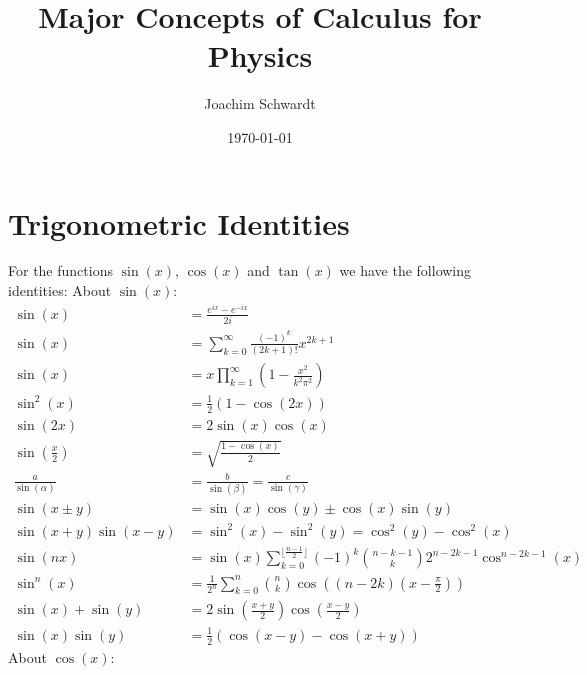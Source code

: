 \documentclass[a4paper,12pt]{article}
\begin{document}
\title{Major Concepts of Calculus for Physics}
\author{Joachim Schwardt}
\date{\today}
\maketitle

\section{Trigonometric Identities}
For the functions $\sin(x)$, $\cos(x)$ and $\tan(x)$ we have the following identities:
About $\sin(x)$:
\begin{align*}
\sin(x) &= \frac{e^{ix}-e^{-ix}}{2i} \\
\sin(x) &= \sum_{k=0}^{\infty}\frac{(-1)^k}{(2k+1)!}x^{2k+1} \\
\sin(x) &= x\prod_{k=1}^{\infty}\left(1-\frac{x^2}{k^2\pi^2}\right) \\
\sin^2(x) &= \frac{1}{2}(1-\cos(2x)) \\
\sin(2x) &= 2\sin(x)\cos(x) \\
\sin\left(\frac{x}{2}\right) &= \sqrt{\frac{1-\cos(x)}{2}} \\
\frac{a}{\sin(\alpha)} &= \frac{b}{\sin(\beta)}=\frac{c}{\sin(\gamma)} \\
\sin(x\pm y) &= \sin(x)\cos(y)\pm\cos(x)\sin(y) \\
\sin(x+y)\sin(x-y)&=\sin^2(x)-\sin^2(y)=\cos^2(y)-\cos^2(x) \\
\sin(nx) &= \sin(x) \sum_{k=0}^{\lfloor\frac{n-1}{2}\rfloor} (-1)^k {n-k-1 \choose k} 2^{n-2k-1} \cos^{n-2k-1}(x) \\
\sin^n(x) &= \frac{1}{2^n}\sum_{k=0}^n {n\choose k}\cos\left( (n-2k)(x-\frac{\pi}{2}) \right) \\
\sin(x)+\sin(y) &= 2\sin\left(\frac{x+y}{2}\right)\cos\left(\frac{x-y}{2}\right) \\
\sin(x)\sin(y) &= \frac{1}{2}\left(\cos(x-y)-\cos(x+y)\right)
\end{align*}
About $\cos(x)$:
\end{document}
